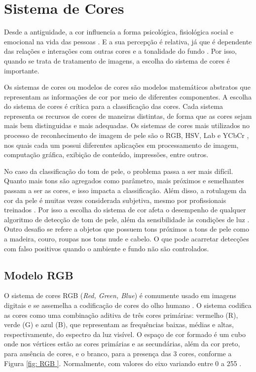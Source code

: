  
\section{Sistema de Cores}
 Desde a antiguidade, a cor influencia a forma psicológica, fisiológica social e emocional na vida das pessoas \cite{Visagismo}. E a sua percepção é relativa, já que é dependente das relações e interações com outras cores e a tonalidade do fundo \cite{Visagismo}. Por isso, quando se trata de tratamento de imagens, a escolha do sistema de cores é importante.

Os sistemas de cores ou modelos de cores são modelos matemáticos abstratos que representam as informações de cor por meio de diferentes componentes. A escolha do sistema de cores é crítica para a classificação das cores. Cada sistema representa os recursos de cores de maneiras distintas, de forma que as cores sejam mais bem distinguidas e mais adequadas. Os sistemas de cores mais utilizados no processo de reconhecimento de imagem de pele são o RGB, HSV, Lab e YCbCr \cite{Modelo_matematico_para_reducao}, nos quais cada um possui diferentes aplicações em processamento de imagem, computação gráfica, exibição de conteúdo, impressões, entre outros.

No caso da classificação do tom de pele, o problema passa a ser mais difícil. Quanto mais tons são agregados como parâmetro, mais próximos e semelhantes passam a ser as cores, e isso impacta a classificação. Além disso, a rotulagem da cor da pele é muitas vezes considerada subjetiva, mesmo por profissionais treinados \cite{Automatic_Skin_Tone_Extraction_for_Visagism_Applications}.
Por isso a escolha do sistema de cor afeta o desempenho de qualquer algoritmo de detecção de tom de pele, além da sensibilidade às condições de luz \cite{Skin_detection_ashort_tutorial}. Outro desafio se refere a objetos que possuem tons próximos a tons de pele como a madeira, couro, roupas nos tons nude e cabelo. O que pode acarretar detecções com falso positivos quando o ambiente e fundo não são controlados.


\subsection{Modelo RGB}
O sistema de cores RGB (\textit{Red, Green, Blue}) é comumente usado em imagens digitais e se assemelha a codificação de cores do olho humano \cite{Visão_Computacional_Indexação_Automatizada_de_Imagens}. O sistema codifica as cores como uma combinação aditiva de três cores primárias: vermelho (R), verde (G) e azul (B), que representam as frequências baixas, médias e altas, respectivamente, do espectro da luz visível. O espaço de cor formado é um cubo onde nos vértices estão as cores primárias e as secundárias, além da cor preto, para ausência de cores, e o branco, para a presença das 3 cores, conforme a Figura \ref{fig: RGB }. Normalmente, com valores do eixo variando entre 0 a 255 \cite{Cor_Aspectos_relevantes_para_viualização_de_cor}. 


